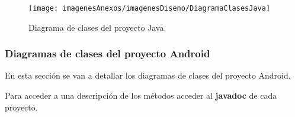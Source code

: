 \begin{figure}[h]
    \begin{center}%
        \begin{center}%
          \texttt{[image: imagenesAnexos/imagenesDiseno/DiagramaClasesJava]}%
          \caption{Diagrama de clases del proyecto Java.}%
          \label{figDiagramaClasesJava}%
        \end{center}%
  	\end{center}%
\end{figure}%

\newpage
\subsubsection{Diagramas de clases del proyecto Android}

En esta sección se van a detallar los diagramas de clases del proyecto Android.

Para acceder a una descripción de los métodos acceder al \textbf{javadoc} de cada proyecto.

